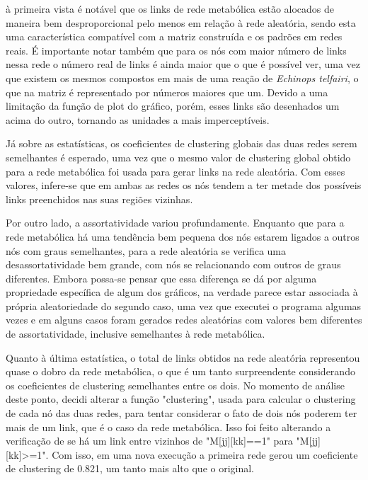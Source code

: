 \documentclass[brazilian,12pt,a4paper,final]{article}
\begin{document}
	à primeira vista é notável que os links de rede metabólica estão alocados de maneira bem desproporcional pelo menos em relação à rede aleatória, sendo esta uma característica compatível com a matriz construída e os padrões em redes reais. É importante notar também que para os nós com maior número de links nessa rede o número real de links é ainda maior que o que é possível ver, uma vez que existem os mesmos compostos em mais de uma reação de \textit{Echinops telfairi}, o que na matriz é representado por números maiores que um. Devido a uma limitação da função de plot do gráfico, porém, esses links são desenhados um acima do outro, tornando as unidades a mais imperceptíveis.
	\vspace{0.5cm}
	
	Já sobre as estatísticas, os coeficientes de clustering globais das duas redes serem semelhantes é esperado, uma vez que o mesmo valor de clustering global obtido para a rede metabólica foi usada para gerar links na rede aleatória. Com esses valores, infere-se que em ambas as redes os nós tendem a ter metade dos possíveis links preenchidos nas suas regiões vizinhas.
	\vspace{0.5cm}
	
	Por outro lado, a assortatividade variou profundamente. Enquanto que para a rede metabólica há uma tendência bem pequena dos nós estarem ligados a outros nós com graus semelhantes, para a rede aleatória se verifica uma desassortatividade bem grande, com nós se relacionando com outros de graus diferentes. Embora possa-se pensar que essa diferença se dá por alguma propriedade específica de algum dos gráficos, na verdade parece estar associada à própria aleatoriedade do segundo caso, uma vez que executei o programa algumas vezes e em alguns casos foram gerados redes aleatórias com valores bem diferentes de assortatividade, inclusive semelhantes à rede metabólica.
	\vspace{0.5cm}
	
	Quanto à última estatística, o total de links obtidos na rede aleatória representou quase o dobro da rede metabólica, o que é um tanto surpreendente considerando os coeficientes de clustering semelhantes entre os dois. No momento de análise deste ponto, decidi alterar a função "clustering", usada para calcular o clustering de cada nó das duas redes, para tentar considerar o fato de dois nós poderem ter mais de um link, que é o caso da rede metabólica. Isso foi feito alterando a verificação de se há um link entre vizinhos de "M[jj][kk]==1" para "M[jj][kk]>=1". Com isso, em uma nova execução a primeira rede gerou um coeficiente de clustering de 0.821, um tanto mais alto que o original.
	\vspace{0.5cm}
	
\end{document}

